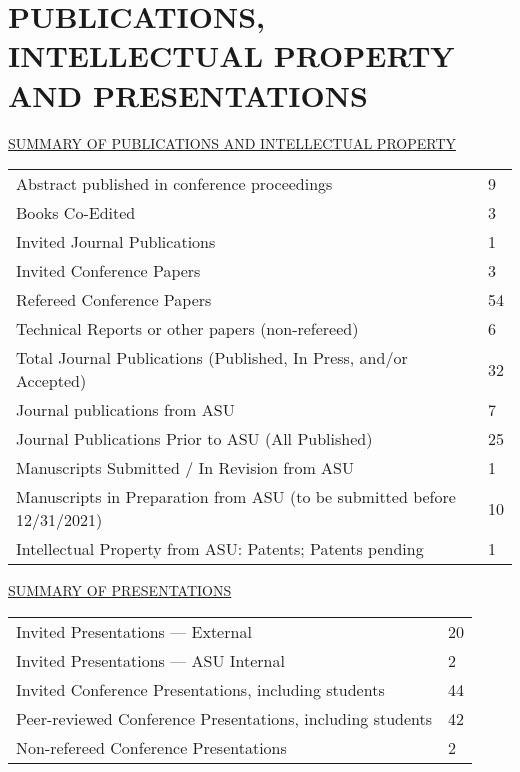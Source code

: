 \documentclass[letterpaper, 12pt]{extarticle}
\begin{document}
\part*{\uppercase{Publications, Intellectual Property and Presentations}}
\uppercase{\underline{Summary of Publications and Intellectual Property}}

\begin{tabular}{p{}p{}}
Abstract published in conference proceedings      & 9\\
Books Co-Edited                                   & 3\\
Invited Journal Publications                      & 1\\
Invited Conference Papers                         & 3\\
Refereed Conference Papers                        & 54\\
Technical Reports or other papers (non-refereed)  & 6\\
Total Journal Publications \newline
(Published, In Press, and/or Accepted)            & 32\\
Journal publications from ASU                     & 7\\
Journal Publications Prior to ASU (All Published) & 25\\
Manuscripts Submitted / In Revision from ASU      & 1\\
Manuscripts in Preparation from ASU \newline
(to be submitted before 12/31/2021)               & 10\\
Intellectual Property from ASU: \newline
Patents; Patents pending                          & 1\\
\end{tabular}

\vspace{1ex}
\uppercase{\underline{Summary of Presentations}}

\begin{tabular}{p{}p{}}
Invited Presentations --- External     & 20\\
Invited Presentations --- ASU Internal & 2\\
Invited Conference Presentations, \newline
including students                     & 44\\
Peer-reviewed Conference Presentations, \newline
including students                     & 42\\
Non-refereed Conference Presentations  & 2\\
\end{tabular}
\end{document}

